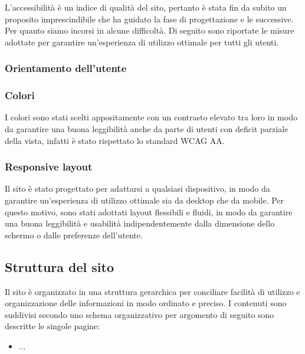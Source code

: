 L'accessibilità è un indice di qualità del sito, pertanto è stata fin da subito
un proposito imprescindibile che ha guidato la fase di progettazione e le
successive. Per quanto siamo incorsi in alcune difficoltà. Di seguito sono
riportate le misure adottate per garantire un'esperienza di utilizzo ottimale
per tutti gli utenti.

\subsubsection{Orientamento dell'utente}

\subsubsection{Colori}

I colori sono stati scelti appositamente con un contrasto elevato tra loro in
modo da garantire una buona leggibilità anche da parte di utenti con deficit
parziale della vista, infatti è stato rispettato lo standard WCAG AA.

\subsubsection{Responsive layout}

Il sito è stato progettato per adattarsi a qualsiasi dispositivo, in modo da
garantire un'esperienza di utilizzo ottimale sia da desktop che da mobile. Per
questo motivo, sono stati adottati layout flessibili e fluidi, in modo da
garantire una buona leggibilità e usabilità indipendentemente dalla dimensione
dello schermo o dalle preferenze dell'utente.

\subsection{Struttura del sito}

Il sito è organizzato in una struttura gerarchica per conciliare facilità di
utilizzo e organizzazione delle informazioni in modo ordinato e preciso. I
contenuti sono suddivisi secondo uno schema organizzativo per argomento di
seguito sono descritte le singole pagine:

\begin{itemize}
    \item ...
\end{itemize}
